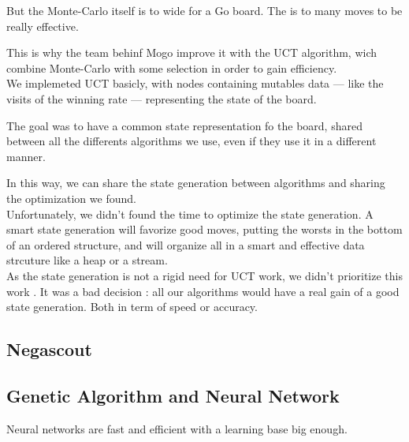 But the Monte-Carlo itself is to wide for a Go board. The is to many moves to be really effective.

This is why the team behinf Mogo improve it with the UCT algorithm, wich combine Monte-Carlo with some selection in order to gain efficiency.\\

We implemeted UCT basicly, with nodes containing mutables data --- like the visits of the winning rate --- representing the state of the board.

The goal was to have a common state representation fo the board, shared between all the differents algorithms we use, even if they use it in a different manner.

In this way, we can share the state generation between algorithms and sharing the optimization we found.\\

Unfortunately, we didn't found the time to optimize the state generation. A smart state generation will favorize good moves, putting the worsts in the bottom of an ordered structure, and will organize all in a smart and effective data strcuture like a heap or a stream.\\

As the state generation is not a rigid need for UCT work, we didn't prioritize this work . It was a bad decision : all our algorithms would have a real gain of a good state generation. Both in term of speed or accuracy.



\subsection{Negascout}



\subsection{Genetic Algorithm and Neural Network}

Neural networks are fast and efficient with a learning base big enough.

